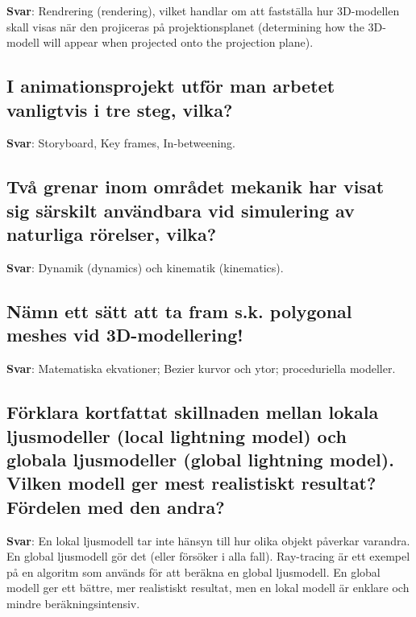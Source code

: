 \documentclass[a4paper,11pt,oneside]{article}
\begin{document}
\begin{sloppypar}
\label{q:301:sa:sv:True}

\textbf{Svar}: Rendrering (rendering), vilket handlar om att fastst\"alla hur 3D-modellen skall visas n\"ar den projiceras p\r{a} projektionsplanet (determining how the 3D-modell will appear when projected onto the projection plane).



\subsection{I animationsprojekt utf\"or man arbetet vanligtvis i tre steg, vilka?}

\label{q:302:sa:sv:True}

\textbf{Svar}: Storyboard, Key frames, In-betweening.



\subsection{Tv\r{a} grenar inom omr\r{a}det mekanik har visat sig s\"arskilt anv\"andbara vid simulering av naturliga r\"orelser, vilka?}

\label{q:303:sa:sv:True}

\textbf{Svar}: Dynamik (dynamics) och kinematik (kinematics).



\subsection{N\"amn ett s\"att att ta fram s.k. polygonal meshes vid 3D-modellering!}

\label{q:304:sa:sv:True}

\textbf{Svar}: Matematiska ekvationer; Bezier kurvor och ytor; proceduriella modeller.



\subsection{F\"orklara kortfattat skillnaden mellan lokala ljusmodeller (local lightning model) och globala ljusmodeller (global lightning model). Vilken modell ger mest realistiskt resultat? F\"ordelen med den andra?}

\label{q:305:sa:sv:True}

\textbf{Svar}: En lokal ljusmodell tar inte h\"ansyn till hur olika objekt p\r{a}verkar varandra. En global ljusmodell g\"or det (eller f\"ors\"oker i alla fall). Ray-tracing \"ar ett exempel p\r{a} en algoritm som anv\"ands f\"or att ber\"akna en global ljusmodell. En global modell ger ett b\"attre, mer realistiskt resultat, men en lokal modell \"ar enklare och mindre ber\"akningsintensiv.




\end{sloppypar}
\end{document}
